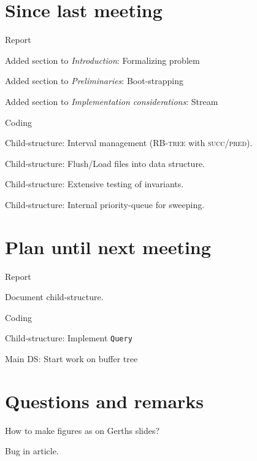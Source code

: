 \documentclass[a4paper,11pt,agenda]{meetingmins}
\begin{document}
\maketitle

\section{Since last meeting}
\begin{items}
\item Report
	\begin{items}
		\item Added section to \textit{Introduction}: Formalizing problem
		\item Added section to \textit{Preliminaries}: Boot-strapping
		\item Added section to \textit{Implementation considerations}: Stream
	\end{items}
\item Coding
	\begin{items}
		\item Child-structure: Interval management (\textsc{RB-tree} with \textsc{succ}/\textsc{pred}).
		\item Child-structure: Flush/Load files into data structure.
		\item Child-structure: Extensive testing of invariants.
		\item Child-structure: Internal priority-queue for sweeping.
	\end{items}
\end{items}

\section{Plan until next meeting}
\begin{items}
\item Report
	\begin{items}
		\item Document child-structure.
	\end{items}
\item Coding
	\begin{items}
		\item Child-structure: Implement \texttt{Query}
		\item Main DS: Start work on buffer tree
	\end{items}
\end{items}

\section{Questions and remarks}
\begin{items}
	\item How to make figures as on Gerths slides?
	\item Bug in article.
\end{items}
\end{document}
